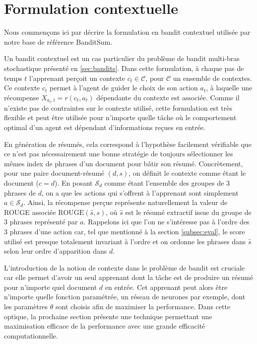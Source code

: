\section{Formulation contextuelle}

Nous commençons ici par décrire la formulation en bandit contextuel utilisée 
par notre base de référence BanditSum. 

Un bandit contextuel est un cas particulier 
du problème de bandit multi-bras stochastique présenté en \ref{sec:bandits}.
Dans cette formulation, à chaque pas de temps $t$ l'apprenant perçoit un 
contexte $c_t \in \mathcal{C}$, pour $\mathcal{C}$ un ensemble de contextes.
Ce contexte $c_t$ permet à l'agent de guider le choix de son action $a_t$,
à laquelle une récompense $X_{a_t,t} = r(c_t, a_t)$ dépendante du contexte est associée.
Comme il n'existe pas de contraintes sur le contexte utilisé, cette
formulation est très flexible et peut être utilisée pour n'importe quelle
tâche où le comportement optimal d'un agent est dépendant d'informations 
reçues en entrée.

En génération de résumés, cela correspond à l'hypothèse facilement vérifiable
que ce n'est pas nécessairement une bonne stratégie de toujours sélectionner
les mêmes index de phrases d'un document pour bâtir son résumé.
Concrètement, pour une paire document-résumé $(d, s)$, on définit le contexte
comme étant le document ($c=d$).
En posant $\mathcal{S}_d$ comme étant l'ensemble des groupes
de 3 phrases de $d$, on a que les actions qui s'offrent à l'apprenant 
sont simplement $a \in \mathcal{S}_d$.
Ainsi, la récompense per­çue représente naturellement la valeur de
ROUGE associée $\text{ROUGE}(\hat{s}, s)$, où $\hat{s}$ est le résumé
extractif issue du groupe de 3 phrases représenté par $a$.
Rappelons ici que l'on ne s'intéresse pas à l'ordre des 3 phrases d'une action car, tel que mentionné
à la section \ref{subsec:eval}, le score utilisé est presque totalement invariant à l'ordre
et on ordonne les phrases dans $\hat{s}$ selon leur ordre d'apparition dans $d$.

L'introduction de la notion de contexte dans le problème de bandit est 
cruciale car elle permet d'avoir un seul apprenant dont la 
tâche est de produire un résumé pour n'importe quel document $d$ en entrée.
Cet apprenant peut alors être n'importe quelle fonction paramétrée, 
un réseau de neurones par exemple, dont les paramètres $\theta$ 
sont choisis afin de maximiser la performance.
Dans cette optique, la prochaine section présente une technique
permettant une maximisation efficace de la performance avec 
une grande efficacité computationnelle.

